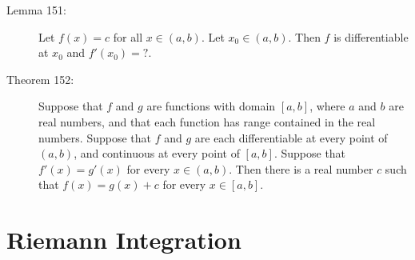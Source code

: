 \documentclass{article}
\begin{document}
\begin{description}
  \item[Lemma 151:] Let $f(x) = c$ for all $x \in (a,b)$. Let $x_{0} \in (a,b)$. Then $f$ is differentiable at $x_{0}$ and $f' (x_{0}) = ?$.

  \item[Theorem 152:] Suppose that $f$ and $g$ are functions with domain $[a,b]$, where $a$ and $b$ are real numbers, and that each function has range contained in the real numbers. Suppose that $f$ and $g$ are each differentiable at every point of $(a,b)$, and continuous at every point of $[a,b]$. Suppose that $f' (x) = g' (x)$ for every $x \in (a,b)$. Then there is a real number $c$ such that $f(x) = g(x) + c$ for every $x \in [a,b]$. 

\end{description}



\newpage

\section{Riemann Integration}
\end{document}
